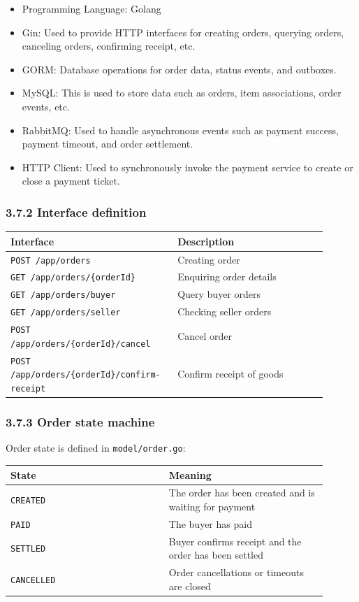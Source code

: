 \documentclass{article}
\begin{document}
\begin{itemize}
    \item Programming Language: Golang
    \item Gin: Used to provide HTTP interfaces for creating orders, querying orders, canceling orders, confirming receipt, etc.
    \item GORM: Database operations for order data, status events, and outboxes.
    \item MySQL: This is used to store data such as orders, item associations, order events, etc.
    \item RabbitMQ: Used to handle asynchronous events such as payment success, payment timeout, and order settlement.
    \item HTTP Client: Used to synchronously invoke the payment service to create or close a payment ticket.
\end{itemize}

\subsubsection{3.7.2 Interface definition}

\begin{longtable}{p{0.45\linewidth}p{0.45\linewidth}}
\toprule
\textbf{Interface} & \textbf{Description} \\
\midrule
\texttt{POST /app/orders} & Creating order \\
\texttt{GET /app/orders/\{orderId\}} & Enquiring order details \\
\texttt{GET /app/orders/buyer} & Query buyer orders \\
\texttt{GET /app/orders/seller} & Checking seller orders \\
\texttt{POST /app/orders/\{orderId\}/cancel} & Cancel order \\
\texttt{POST /app/orders/\{orderId\}/confirm-receipt} & Confirm receipt of goods \\
\bottomrule
\end{longtable}

\subsubsection{3.7.3 Order state machine}

Order state is defined in \texttt{model/order.go}:

\begin{longtable}{p{0.45\linewidth}p{0.45\linewidth}}
\toprule
\textbf{State} & \textbf{Meaning} \\
\midrule
\texttt{CREATED} & The order has been created and is waiting for payment \\
\texttt{PAID} & The buyer has paid \\
\texttt{SETTLED} & Buyer confirms receipt and the order has been settled \\
\texttt{CANCELLED} & Order cancellations or timeouts are closed \\
\bottomrule
\end{longtable}
\end{document}
